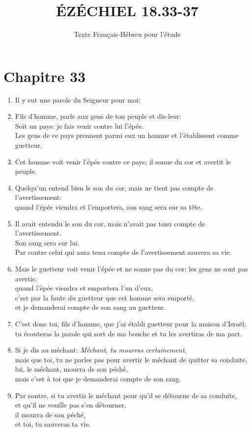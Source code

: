 \documentclass[12pt,a4paper,titlepage]{article}
\title{\vspace{5cm} \huge ÉZÉCHIEL 18.33-37}
\date{Texte Français-Hébreu pour l'étude}
\def \pslabelsep{0.2em} %
\def \psleftmargin{0em} %
\begin{document}
\maketitle
\vfill
\thispagestyle{empty}
\newpage 

\noindent
\section*{Chapitre 33}
\begin{enumerate}[leftmargin=\psleftmargin, labelsep = \pslabelsep, label={\arabic*}, font=\color{\pscolor}\small\textsuperscript, parsep=0em, itemsep=0em, topsep=0em ]
\item Il y eut une parole du Seigneur pour moi:
\item Fils d’homme, parle aux gens de ton peuple et dis-leur: \\ Soit un pays: je fais venir contre lui l’épée.\\ Les gens de ce pays prennent parmi eux un homme et l’établissent comme guetteur.
\item Cet homme voit venir l’épée contre ce pays; il sonne du cor et avertit le peuple.
\item Quelqu’un entend bien le son du cor, mais ne tient pas compte de l’avertissement: \\ quand l’épée viendra et l’emportera, son sang sera sur sa tête. 
\item Il avait entendu le son du cor, mais n’avait pas tenu compte de l’avertissement. \\ Son sang sera sur lui. \\ Par contre celui qui aura tenu compte de l’avertissement sauvera sa vie. 
\item Mais le guetteur voit venir l’épée et ne sonne pas du cor: les gens ne sont pas avertis; \\ quand l’épée viendra et emportera l’un d’eux, \\ c’est par la faute du guetteur que cet homme sera emporté, 
\\ et je demanderai compte de son sang au guetteur. \parSpace

\item C’est donc toi, fils d’homme, que j’ai établi guetteur pour la maison d’Israël;\\ tu écouteras la parole qui sort de ma bouche et tu les avertiras de ma part.
\item Si je dis au méchant: \og{}\emph{Méchant, tu mourras certainement}\fg{},\\ mais que toi, tu ne parles pas pour avertir le méchant de quitter sa conduite, \\ lui, le méchant, mourra de son péché, \\ mais c’est à toi que je demanderai compte de son sang. 
\item Par contre, si tu avertis le méchant pour qu’il se détourne de sa conduite, \\ et qu’il ne veuille pas s’en détourner, \\ il mourra de son péché, \\ et toi, tu sauveras ta vie. \parSpace


\end{enumerate}
\end{document}
